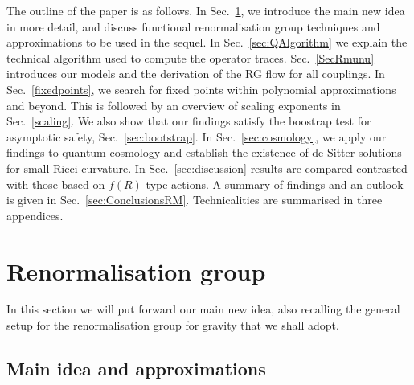 \documentclass[notitlepage,eqsecnum,bm,amsmath,preprintnumbers,superscriptaddress,nofootinbib,aps,11pt]{revtex4-1}
\begin{document}
The outline of the paper is as follows. In Sec.~\ref{sec:RG}, we introduce the main new idea in more detail, and discuss functional renormalisation group techniques and approximations to be used in the sequel. In Sec.~\ref{sec:QAlgorithm} we explain the technical algorithm used to compute the operator traces. Sec.~\ref{SecRmunu} introduces our models and the derivation of the RG flow for all couplings.
In Sec.~\ref{fixedpoints}, we search for fixed points within polynomial approximations and beyond. This is followed by an overview of scaling exponents in Sec.~\ref{scaling}. We also show that our findings satisfy the boostrap test for asymptotic safety, Sec.~\ref{sec:bootstrap}. 
In Sec.~\ref{sec:cosmology}, we apply our findings to quantum cosmology and establish the existence of de Sitter solutions for small Ricci curvature.  In
Sec.~\ref{sec:discussion} results are compared contrasted with those based on $f(R)$ type actions. A summary of findings and an outlook is given in 
Sec.~\ref{sec:ConclusionsRM}. Technicalities are summarised in three appendices.











\section{\bf Renormalisation group}\label{sec:RG}



In this section we will put forward our main new idea, also recalling the general setup for the renormalisation group for gravity that we shall adopt.

\subsection{Main idea and approximations}
\label{subsec:Approximations}
\end{document}
